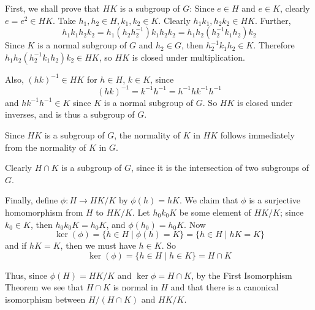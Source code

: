 \documentclass[12pt]{article}
\begin{document}

First, we shall prove that $HK$ is a subgroup of $G$:
Since $e \in H$ and $e \in K$, clearly $e=e^2 \in HK$.
Take $h_1,h_2 \in H, k_1, k_2 \in K$.
Clearly $h_1k_1, h_2k_2 \in HK$.
Further,
\[
  h_1k_1h_2k_2 = h_1(h_2h_2^{-1})k_1h_2k_2 = h_1h_2(h_2^{-1}k_1h_2)k_2
\]
Since $K$ is a normal subgroup of $G$ and $h_2 \in G$,
then $h_2^{-1}k_1h_2 \in K$.
Therefore $h_1h_2(h_2^{-1}k_1h_2)k_2 \in HK$,
so $HK$ is closed under multiplication.

Also, $(hk)^{-1} \in HK$ for $h \in H$, $k \in K$, since
\[
  (hk)^{-1} = k^{-1}h^{-1}=h^{-1}hk^{-1}h^{-1}
\]
and $hk^{-1}h^{-1} \in K$ since $K$ is a normal subgroup of $G$.
So $HK$ is closed under inverses, and is thus a subgroup of $G$.

Since $HK$ is a subgroup of $G$,
the normality of $K$ in $HK$ follows immediately from
the normality of $K$ in $G$.

Clearly $H \cap K$ is a subgroup of $G$,
since it is the intersection of two subgroups of $G$.

Finally, define $\phi\colon H \rightarrow HK/K$ by $\phi(h)=hK$.
We claim that $\phi$ is a surjective homomorphism from $H$ to $HK/K$.
Let $h_0k_0K$ be some element of $HK/K$;
since $k_0 \in K$, then $h_0k_0K=h_0K$, and $\phi(h_0)=h_0K$.
Now
\[
  \ker(\phi) = \{ h \in H \mid \phi(h)=K \} = \{ h \in H \mid hK=K \}
\]
and if $hK=K$, then we must have $h \in K$.  So
\[
  \ker(\phi) = \{ h \in H \mid h \in K \} = H \cap K
\]

Thus, since $\phi(H)=HK/K$ and $\ker{\phi}=H \cap K$,
by the First Isomorphism Theorem we see that
$H \cap K$ is normal in $H$
and that there is a canonical isomorphism between $H/(H \cap K)$ and $HK/K$.
\end{document}
